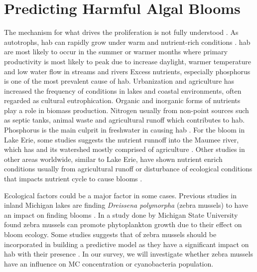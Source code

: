 \section{Predicting Harmful Algal Blooms}
The mechanism for what drives the proliferation is not fully understood \cite{dittmann_cyanobacterial_2012}. As autotrophs, \gls{hab} can rapidly grow under warm and nutrient-rich conditions \cite{rastogi_cyanotoxin-microcystins:_2014}. \gls{hab} are most likely to occur in the summer or warmer months where primary productivity is most likely to peak due to increase daylight, warmer temperature and low water flow in streams and rivers \cite{vannote_river_1980,chapra_climate_2017-2}
Excess nutrients, especially phosphorus is one of the most prevalent cause of \gls{hab}. %
Urbanization and agriculture has increased the frequency of  conditions in lakes and coastal environments, often regarded as cultural eutrophication\cite{smith_eutrophication_2009}.  Organic and inorganic forms of nutrients  play a role in biomass production. Nitrogen usually from non-point sources such as septic tanks, animal waste and agricultural runoff which contributes to \gls{hab}. Phosphorus is the main culprit in freshwater in causing \gls{hab} \cite{anderson_harmful_2002}. For the bloom in Lake Erie, some studies suggests the nutrient runnoff into the  Maumee river, which has and its watershed mostly comprised of agriculture \cite{michalak_record-setting_2013, chaffin_accuracy_2018}. Other studies in other areas worldwide, similar to Lake Erie, have shown nutrient enrich conditions usually from agricultural runoff or disturbance of ecological conditions that impacts nutrient cycle to cause blooms \cite{ahn_evaluation_2011, ahn_rainfall_2002, anderson_harmful_2002, jiang_statistical_2008}.

Ecological factors could be a major factor in some cases. Previous studies in inland Michigan lakes are finding \emph{Dreissena polymorpha} (zebra mussels) to have an impact on finding blooms \cite{vanderploeg_zebra_2001}. In a study done by Michigan State University \cite{raikow_dominance_2004} found zebra mussels can promote phytoplankton growth due to their effect on bloom ecology. Some studies suggests that of zebra mussels should be incorporated in building a predictive model as they have a significant impact on \gls{hab} with their presence \cite{lavrentyev_effects_1995, knoll_invasive_2008, raikow_dominance_2004}. In our survey, we will investigate whether zebra mussels have an influence on MC concentration or cyanobacteria population.

